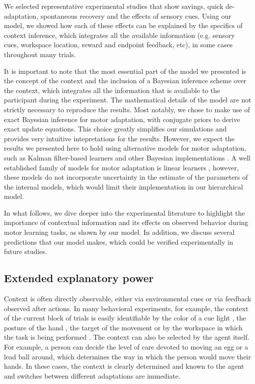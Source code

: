 \documentclass[a4paper,doc,floatsintext,natbib]{apa6}
\begin{document}
We selected representative experimental studies that show savings, quick de-adaptation, spontaneous recovery and the effects of sensory cues. Using our model, we showed how each of these effects can be explained by the specifics of context inference, which integrates all the available information (e.g. sensory cues, workspace location, reward and endpoint feedback, etc), in some cases throughout many trials.

It is important to note that the most essential part of the model we presented is the concept of the context and the inclusion of a Bayesian inference scheme over the context, which integrates all the information that is available to the participant during the experiment. The mathematical details of the model are not strictly necessary to reproduce the results. Most notably, we chose to make use of exact Bayesian inference for motor adaptation, with conjugate priors to derive exact update equations. This choice greatly simplifies our simulations and provides very intuitive intepretations for the results. However, we expect the results we presented here to hold using alternative models for motor adaptation, such as Kalman filter-based learners \cite[e.g.][]{Oh_Minimizing_2019,Baddeley_System_2003} and other Bayesian implementations \cite[e.g.][]{Wolpert_Multiple_1998,Kording_Bayesian_2004}. A well established family of models for motor adaptation is linear learners \cite[e.g.][]{Smith_Interacting_2006,Forano_Timescales_2020,Lee_Dual_2009}, however, these models do not incorporate uncertainty in the estimate of the parameters of the internal models, which would limit their implementation in our hierarchical model.

In what follows, we dive deeper into the experimental literature to highlight the importance of contextual information and its effects on observed behavior during motor learning tasks, as shown by our model. In addition, we discuss several predictions that our model makes, which could be verified experimentally in future studies.

\subsection{Extended explanatory power}
Context is often directly observable, either via environmental cues or via feedback observed after actions. In many behavioral experiments, for example, the context of the current block of trials is easily identifiable by the color of a cue light \citep[e.g.][]{Ethier_Spontaneous_2008}, the posture of the hand \citep[e.g.][]{Gandolfo_Motor_1996}, the target of the movement \citep[e.g.][]{Lee_Dual_2009} or by the workspace in which the task is being performed \citep[e.g.][]{Shadmehr_Adaptive_1994}. The context can also be selected by the agent itself. For example, a person can decide the level of care devoted to moving an egg or a lead ball around, which determines the way in which the person would move their hands. In these cases, the context is clearly determined and known to the agent and switches between different adaptations are immediate.
\end{document}
